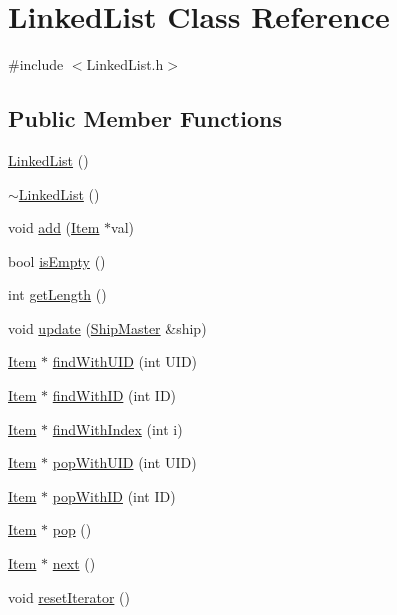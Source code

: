 \hypertarget{classLinkedList}{\section{Linked\-List Class Reference}
\label{classLinkedList}
}


{\ttfamily \#include $<$Linked\-List.\-h$>$}

\subsection*{Public Member Functions}
\begin{DoxyCompactItemize}
\item 
\hyperlink{classLinkedList_afe7f78983e173f8018927cf2ad11a5aa}{Linked\-List} ()
\item 
\hyperlink{classLinkedList_a35811ed58ff0d8d9cc9b309b8d8f5111}{$\sim$\-Linked\-List} ()
\item 
void \hyperlink{classLinkedList_a78172a81bf60fbbd33e65305826d028b}{add} (\hyperlink{classItem}{Item} $\ast$val)
\item 
bool \hyperlink{classLinkedList_a03ff22f881325da2d37f640ab2380bf2}{is\-Empty} ()
\item 
int \hyperlink{classLinkedList_a92bb5271734b51ab089d75bf52aee919}{get\-Length} ()
\item 
void \hyperlink{classLinkedList_ae973d79346684a26166c539896d2d1b7}{update} (\hyperlink{classShipMaster}{Ship\-Master} \&ship)
\item 
\hyperlink{classItem}{Item} $\ast$ \hyperlink{classLinkedList_a52c070ab08f67e26ec260412024fb20e}{find\-With\-U\-I\-D} (int U\-I\-D)
\item 
\hyperlink{classItem}{Item} $\ast$ \hyperlink{classLinkedList_ae051024e7e6ba32002ba0f40a7843f0d}{find\-With\-I\-D} (int I\-D)
\item 
\hyperlink{classItem}{Item} $\ast$ \hyperlink{classLinkedList_ab7bc50ad1c97b0559d00e5a6e2da78cd}{find\-With\-Index} (int i)
\item 
\hyperlink{classItem}{Item} $\ast$ \hyperlink{classLinkedList_abfe92bb8d0e4ab6072a09a74a515111e}{pop\-With\-U\-I\-D} (int U\-I\-D)
\item 
\hyperlink{classItem}{Item} $\ast$ \hyperlink{classLinkedList_a181a5fd6df446be45690966536aaf3c6}{pop\-With\-I\-D} (int I\-D)
\item 
\hyperlink{classItem}{Item} $\ast$ \hyperlink{classLinkedList_a30b300a0ad095ac7c19717cb3894ddb2}{pop} ()
\item 
\hyperlink{classItem}{Item} $\ast$ \hyperlink{classLinkedList_a7106d9f9335485f9f4bc6945d25d9804}{next} ()
\item 
void \hyperlink{classLinkedList_aa97c4254d7eacee2b33ce306c3162b61}{reset\-Iterator} ()
\end{DoxyCompactItemize}


